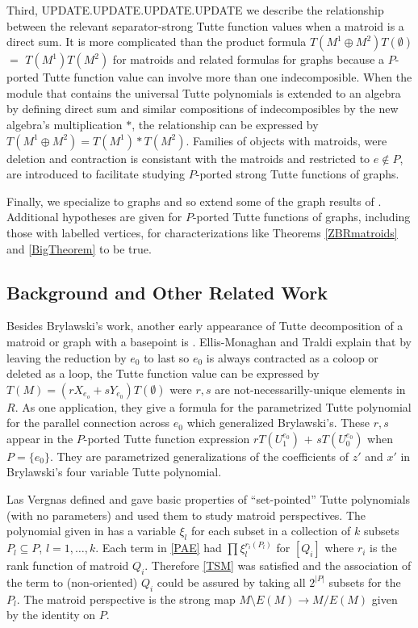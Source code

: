 \documentclass[12pt,leqno]{amsart}
\theoremstyle{remark}
\begin{document}
Third, UPDATE.UPDATE.UPDATE.UPDATE 
we describe the relationship between the relevant 
separator-strong Tutte function
values when a matroid is a direct sum.  It is more complicated than
the product formula $T(M^1\oplus M^2)T(\emptyset)$ $=$ $T(M^1)T(M^2)$
for matroids and related formulas for graphs \cite{Ellis-Monaghan-Traldi}
because a $P$-ported Tutte function value can involve more than one
indecomposible.  When the 
module that contains the universal Tutte polynomials is extended
to an algebra by defining direct sum and similar compositions of 
indecomposibles by the new algebra's multiplication $*$, the 
relationship can be expressed by $T(M^1\oplus M^2) = T(M^1)*T(M^2)$.
Families of objects with matroids, were deletion and contraction
is consistant with the matroids and restricted to $e\not\in P$,
are introduced to facilitate studying $P$-ported strong Tutte
functions of graphs. 

Finally, we specialize to graphs and so extend some of the graph
results of \cite{Ellis-Monaghan-Traldi}.  Additional hypotheses
are given for $P$-ported Tutte functions of graphs, including
those with labelled vertices, for characterizations like
Theorems \ref{ZBRmatroids} and \ref{BigTheorem} to be true.

\subsection{Background and Other Related Work}
\label{BackgroundSec}

Besides Brylawski's 
work,  another early appearance of Tutte decomposition
of a matroid or graph with a basepoint is \cite{SmithPatroids}.
Ellis-Monaghan and Traldi \cite{Ellis-Monaghan-Traldi}
explain that by leaving the reduction
by $e_0$ to last so $e_0$ is always contracted as a coloop or deleted
as a loop, the Tutte function value can be expressed by
$T(M) = (rX_{e_o} + sY_{e_0})T(\emptyset)$ were $r, s$ are 
not-necessarilly-unique elements in $R$.  As one application,
they 
give a formula for the parametrized Tutte polynomial
for the parallel connection across $e_0$
which generalized Brylawski's.
These $r,s$ appear in
the $P$-ported Tutte function expression 
$rT(U^{e_0}_1)$ $+$ $sT(U^{e_0}_0)$ when $P=\{e_0\}$.  They
are parametrized generalizations of the coefficients of
$z'$ and $x'$ in Brylawski's four variable Tutte polynomial.

Las Vergnas defined and gave basic properties of ``set-pointed'' Tutte
polynomials (with no parameters) and used them to study matroid perspectives.
The polynomial given in \cite{MR0419272,SetPointedLV} has a variable
$\xi_l$ for each subset in a collection of $k$ subsets
$P_l\subseteq P$, $l=1,\ldots,k$.  Each term in \eqref{PAE} had
$\prod\xi_l^{r_i(P_l)}$ for $[Q_i]$ where $r_i$ is the rank function 
of matroid $Q_i$.  Therefore \eqref{TSM} was satisfied and the association of the
term to (non-oriented) $Q_i$ could be assured by taking all
$2^{|P|}$ subsets for the $P_l$.  The matroid perspective is the 
strong map $M\setminus E(M)\rightarrow M/E(M)$ given by the identity on
$P$.  
\end{document}
